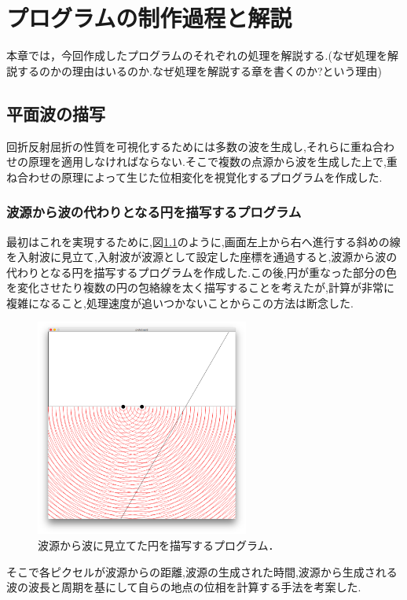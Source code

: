 \chapter{プログラムの制作過程と解説}
本章では，今回作成したプログラムのそれぞれの処理を解説する.(なぜ処理を解説するのかの理由はいるのか.なぜ処理を解説する章を書くのか?という理由)

\section{平面波の描写}
回折反射屈折の性質を可視化するためには多数の波を生成し,それらに重ね合わせの原理を適用しなければならない.そこで複数の点源から波を生成した上で,重ね合わせの原理によって生じた位相変化を視覚化するプログラムを作成した.

\subsection{波源から波の代わりとなる円を描写するプログラム}
最初はこれを実現するために,図\ref{fig:missdraw}のように,画面左上から右へ進行する斜めの線を入射波に見立て,入射波が波源として設定した座標を通過すると,波源から波の代わりとなる円を描写するプログラムを作成した.この後,円が重なった部分の色を変化させたり複数の円の包絡線を太く描写することを考えたが,計算が非常に複雑になること,処理速度が追いつかないことからこの方法は断念した.

\begin{figure}[htbp]
 \begin{center}
  \includegraphics[width=70mm]{../implement/miss_draw.png}
 \end{center}
 \caption{波源から波に見立てた円を描写するプログラム．}
 \label{fig:missdraw}
\end{figure}

\newpage
そこで各ピクセルが波源からの距離,波源の生成された時間,波源から生成される波の波長と周期を基にして自らの地点の位相を計算する手法を考案した.

